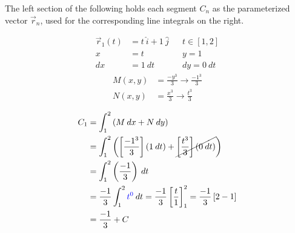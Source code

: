 \documentclass{article}
\begin{document}
The left section of the following holds each segment $C_n$ as the parameterized vector $\vec{r}_n$, used for the corresponding line integrals on the right.
\begin{center}
\noindent\begin{minipage}{0.4\linewidth}
    \begin{equation*}
    \begin{aligned}
        \vec{r}_1(t) &= t\:\hat{i} + 1\:\hat{j} && t \in \left[1, 2\right] \\
        x &= t && y = 1 \\
        dx &= 1\:dt && dy = 0\:dt
    \end{aligned}
    \end{equation*}
    \begin{equation*}
    \begin{aligned}
        M(x,y) &= \frac{-y^3}{3} \to \frac{-1^3}{3} \\
        N(x,y) &= \frac{x^3}{3} \to \frac{t^3}{3}
    \end{aligned}
    \end{equation*}
\end{minipage}
\begin{minipage}{0.4\linewidth}
    \begin{equation*}
    \begin{aligned}
            C_1 &= \int_1^2{\left( M\:dx + N\:dy \right)} \\
            &= \int_1^2{ \left( \left[\frac{-1^3}{3}\right] \left( 1\:dt \right) + \cancel{\left[\frac{t^3}{3}\right] \left( 0\:dt \right)} \right)} \\
            &= \int_1^2{ \left(\frac{-1}{3}\right) \: dt} \\
            &= \frac{-1}{3}\int_1^2{\textcolor{blue}{t^0}\:dt} = \frac{-1}{3}\left[\frac{t}{1}\right]_1^2
            = \frac{-1}{3}\left[2 - 1\right] \\
            &= \frac{-1}{3} + C \\
    \end{aligned}
    \end{equation*}
    \end{minipage}
\end{center}
\end{document}
